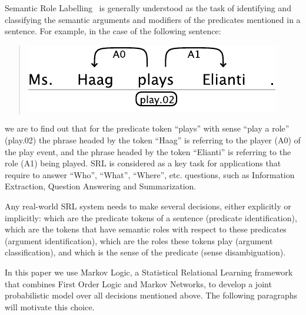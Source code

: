 
Semantic Role Labelling~\citep[SRL, ][]{marquez08srl}
is generally understood as the task of identifying and classifying the semantic arguments and modifiers of the predicates mentioned in a sentence. For example, in the case of the following sentence:
\begin{quote}
\begin{center}
    \includegraphics[scale=.63]{haag-example}
\end{center}
\end{quote}
we are to find out that for the predicate token {}``plays'' with sense ``play a role'' (play.02) the
phrase headed by the token {}``Haag'' is referring to the player (A0) of the play event, and
the phrase headed by the token {}``Elianti''  is referring to the role (A1)
being played. 
SRL is considered as a key task for applications that require to
answer {}``Who'', {}``What'', {}``Where'', etc. questions, such
as Information Extraction, Question Answering and Summarization. 

Any real-world SRL system needs to make several decisions, either
explicitly or implicitly: which are the predicate tokens of a sentence
(predicate identification), which are the tokens that have semantic
roles with respect to these predicates (argument identification),
which are the roles these tokens play (argument classification), and
which is the sense of the predicate (sense disambiguation).

In this paper we use Markov Logic, a Statistical Relational Learning
framework that combines First Order Logic and Markov Networks, to
develop a joint probabilistic model over all decisions mentioned above.
The following paragraphs will motivate this choice. %

